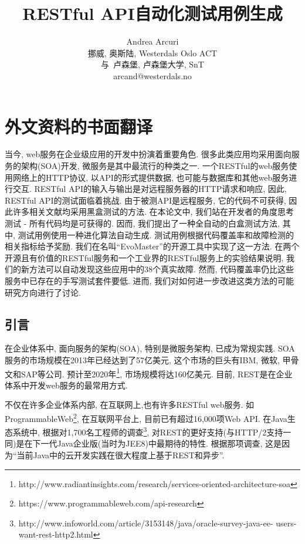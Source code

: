 \chapter{外文资料的书面翻译}

\title{RESTful API自动化测试用例生成}

\author{Andrea Arcuri\\挪威, 奥斯陆, Westerdals Oslo ACT\\与\ 卢森堡, 卢森堡大学, SnT\\ arcand@westerdals.no}

\begin{cabstract}
当今, web服务在企业级应用的开发中扮演着重要角色. 很多此类应用均采用面向服务的架构(SOA)开发, 微服务是其中最流行的种类之一. 一个RESTful的web服务使用网络上的HTTP协议, 以API的形式提供数据, 也可能与数据库和其他web服务进行交互. RESTful API的输入与输出是对远程服务器的HTTP请求和响应, 因此, RESTful API的测试面临着挑战. 由于被测API是远程服务, 它的代码不可获得, 因此许多相关文献均采用黑盒测试的方法. 在本论文中, 我们站在开发者的角度思考测试 - 所有代码均是可获得的. 因而, 我们提出了一种全自动的白盒测试方法, 其中, 测试用例使用一种进化算法自动生成. 测试用例根据代码覆盖率和故障检测的相关指标给予奖励. 我们在名叫“EvoMaster”的开源工具中实现了这一方法. 在两个开源且有价值的RESTful服务和一个工业界的RESTful服务上的实验结果说明, 我们的新方法可以自动发现这些应用中的38个真实故障. 然而, 代码覆盖率仍比这些服务中已存在的手写测试套件要低. 进而, 我们对如何进一步改进这类方法的可能研究方向进行了讨论.
\end{cabstract}



\section{引言}
在企业体系中, 面向服务的架构(SOA), 特别是微服务架构, 已成为常规实践. SOA服务的市场规模在2013年已经达到了57亿美元, 这个市场的巨头有IBM, 微软, 甲骨文和SAP等公司. 预计至2020年\footnote{http://www.radiantinsights.com/research/services-oriented-architecture-soa}, 市场规模将达160亿美元. 目前, REST是在企业体系中开发web服务的最常用方式. 

不仅在许多企业体系内部, 在互联网上,也有许多RESTful web服务. 如ProgrammableWeb\footnote{https://www.programmableweb.com/api-research}, 在互联网平台上, 目前已有超过16,000项Web API. 在Java生态系统中, 根据对1,700名工程师的调查\footnote{http://www.infoworld.com/article/3153148/java/oracle-survey-java-ee-
users-want-rest-http2.html}, 对REST的更好支持(与HTTP/2支持一同)是在下一代Java企业版(当时为JEE8)中最期待的特性. 根据那项调查, 这是因为“当前Java中的云开发实践在很大程度上基于REST和异步”. 

